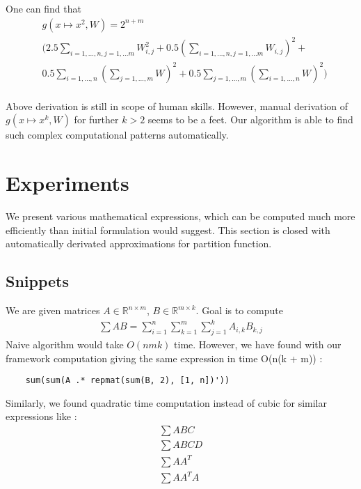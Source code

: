 \documentclass{article}
\begin{document}
One can find that 
\begin{align*}
	&g(x \mapsto x^2, W) = 2^{n + m} \\ 
 &\Big( 2.5\sum_{i = 1, \dots, n, j = 1, \dots m} W_{i, j}^2 + 0.5(\sum_{i = 1, \dots, n, j = 1, \dots m} W_{i, j})^2 + \\
 &0.5\sum_{i = 1, \dots, n}(\sum_{j = 1, \dots, m} W)^2 + 0.5\sum_{j = 1, \dots, m}(\sum_{i = 1, \dots, n} W)^2 \Big)\\
\end{align*}

Above derivation is still in scope of human skills. However, manual derivation
of $g(x \mapsto x^k, W)$ for further $k > 2$  seems to be a feet. Our algorithm
is able to find such complex computational patterns automatically.

\section{Experiments}

We present various mathematical expressions, which can be computed much more efficiently
than initial formulation would suggest. This section is closed with automatically derivated
approximations for partition function. 

\subsection{Snippets}

We are given matrices $A \in \mathbb{R}^{n \times m}$, $B \in \mathbb{R}^{m \times k}$. 
Goal is to compute 
\begin{align*}
	\sum AB = \sum_{i = 1}^n \sum_{k = 1}^m \sum_{j = 1}^k A_{i, k} B_{k, j} 
\end{align*}
Naive algorithm would take $O(nmk)$ time. However, we have found with our framework 
computation giving the same expression in time O(n(k + m)) :

\begin{verbatim}
	sum(sum(A .* repmat(sum(B, 2), [1, n])'))
\end{verbatim}

Similarly, we found quadratic time computation instead of cubic for similar expressions like : 
\begin{align*}
	\sum ABC\\
	\sum ABCD\\
	\sum AA^T\\
	\sum AA^TA\\
\end{align*}
\end{document}
